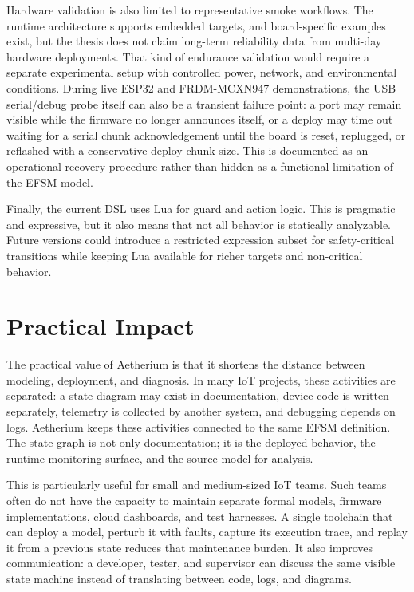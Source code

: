 Hardware validation is also limited to representative smoke workflows. The runtime architecture supports embedded targets, and board-specific examples exist, but the thesis does not claim long-term reliability data from multi-day hardware deployments. That kind of endurance validation would require a separate experimental setup with controlled power, network, and environmental conditions. During live ESP32 and FRDM-MCXN947 demonstrations, the USB serial/debug probe itself can also be a transient failure point: a port may remain visible while the firmware no longer announces itself, or a deploy may time out waiting for a serial chunk acknowledgement until the board is reset, replugged, or reflashed with a conservative deploy chunk size. This is documented as an operational recovery procedure rather than hidden as a functional limitation of the EFSM model.

Finally, the current DSL uses Lua for guard and action logic. This is pragmatic and expressive, but it also means that not all behavior is statically analyzable. Future versions could introduce a restricted expression subset for safety-critical transitions while keeping Lua available for richer targets and non-critical behavior.

\section{Practical Impact}
\label{sec:practical-impact}

The practical value of Aetherium is that it shortens the distance between modeling, deployment, and diagnosis. In many IoT projects, these activities are separated: a state diagram may exist in documentation, device code is written separately, telemetry is collected by another system, and debugging depends on logs. Aetherium keeps these activities connected to the same EFSM definition. The state graph is not only documentation; it is the deployed behavior, the runtime monitoring surface, and the source model for analysis.

This is particularly useful for small and medium-sized IoT teams. Such teams often do not have the capacity to maintain separate formal models, firmware implementations, cloud dashboards, and test harnesses. A single toolchain that can deploy a model, perturb it with faults, capture its execution trace, and replay it from a previous state reduces that maintenance burden. It also improves communication: a developer, tester, and supervisor can discuss the same visible state machine instead of translating between code, logs, and diagrams.

